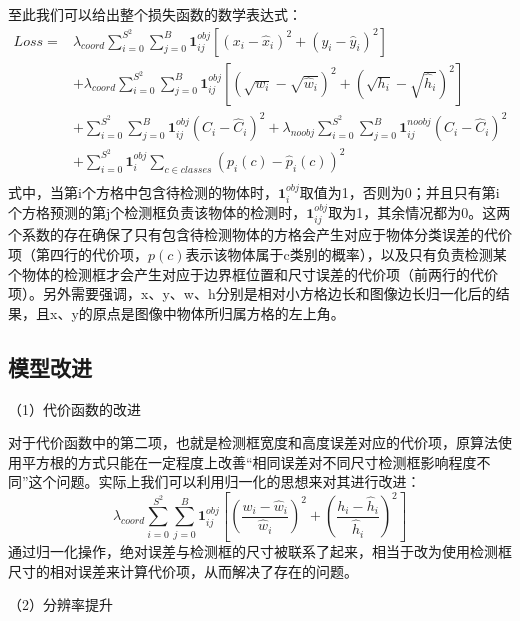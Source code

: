 至此我们可以给出整个损失函数的数学表达式：
\begin{equation} \label{eq:3_2_loss_function}
\begin{split}
Loss = & \lambda_{coord} \sum_{i=0}^{S^2}\sum_{j=0}^B \mathbf{1}_{ij}^{obj}
			\left[(x_i - \hat{x}_i)^2 + (y_i - \hat{y}_i)^2\right] \\
& + \lambda_{coord}  \sum_{i=0}^{S^2}\sum_{j=0}^B \mathbf{1}_{ij}^{obj}
			\left[ \left(\sqrt{w_i} - \sqrt{\hat{w}_i} \right) ^2 + \left( \sqrt{h_i} - \sqrt{\hat{h}_i} \right) ^2\right] \\
& + \sum_{i=0}^{S^2}\sum_{j=0}^B \mathbf{1}_{ij}^{obj} (C_i - \hat{C}_i)^2
			+ \lambda_{noobj} \sum_{i=0}^{S^2}\sum_{j=0}^B \mathbf{1}_{ij}^{noobj} (C_i - \hat{C}_i)^2 \\
& + \sum_{i=0}^{S^2} \mathbf{1}_{i}^{obj} \sum_{c \in classes} ( p_i(c) - \hat{p}_i(c) )^2 \\
\end{split}
\end{equation}
式中，当第i个方格中包含待检测的物体时，$\mathbf{1}_{i}^{obj}$取值为1，否则为0；并且只有第i个方格预测的第j个检测框负责该物体的检测时，$\mathbf{1}_{ij}^{obj}$取为1，其余情况都为0。这两个系数的存在确保了只有包含待检测物体的方格会产生对应于物体分类误差的代价项（第四行的代价项，$p(c)$表示该物体属于c类别的概率），以及只有负责检测某个物体的检测框才会产生对应于边界框位置和尺寸误差的代价项（前两行的代价项）。另外需要强调，x、y、w、h分别是相对小方格边长和图像边长归一化后的结果，且x、y的原点是图像中物体所归属方格的左上角。


\subsection{模型改进} %
（1）代价函数的改进

对于代价函数中的第二项，也就是检测框宽度和高度误差对应的代价项，原算法使用平方根的方式只能在一定程度上改善“相同误差对不同尺寸检测框影响程度不同”这个问题。实际上我们可以利用归一化的思想来对其进行改进：
\begin{equation}
\lambda_{coord}  \sum_{i=0}^{S^2}\sum_{j=0}^B \mathbf{1}_{ij}^{obj}
\left[ \left(\frac{w_i - \hat{w}_i}{\hat{w}_i} \right) ^2 + \left( \frac{h_i - \hat{h}_i}{\hat{h}_i} \right) ^2\right]
\end{equation}
通过归一化操作，绝对误差与检测框的尺寸被联系了起来，相当于改为使用检测框尺寸的相对误差来计算代价项，从而解决了存在的问题。

（2）分辨率提升 %

